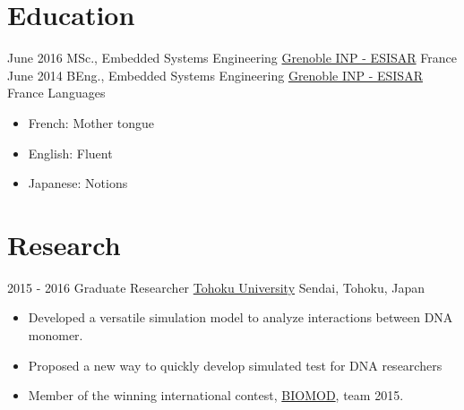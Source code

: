 \documentclass[a4paper]{template} %
\begin{document}
\makeprofile %

\section{Education}

\begin{twenty} %
	\twentyitem
    	{June 2016}
        {MSc., Embedded Systems Engineering}
        {\href{http://esisar.grenoble-inp.fr/}{Grenoble INP - ESISAR}}
        {France}
				{}
	\twentyitem
    	{June 2014}
        {BEng., Embedded Systems Engineering}
        {\href{http://esisar.grenoble-inp.fr/}{Grenoble INP - ESISAR}}
        {France}
				{}
	\twentyitem
	    	{}
	        {Languages}
	        {}
	        {}
	        {
	        {\begin{itemize}
							\item French: Mother tongue
							\item English: Fluent
							\item Japanese: Notions
			    \end{itemize}}
	        }
\end{twenty}


\section{Research}
\begin{twenty}
	\twentyitem
    	{2015 - 2016}
        {Graduate Researcher}
        {\href{http://www.tohoku.ac.jp/en/}{Tohoku University}}
        {Sendai, Tohoku, Japan}
        {
        {\begin{itemize}
        \item Developed a versatile simulation model to analyze interactions between DNA monomer.
        \item Proposed a new way to quickly develop simulated test for DNA researchers
        \item Member of the winning international contest, \href{http://biomod.net/winners/2015.html}{BIOMOD}, team 2015.
    \end{itemize}}
        }
\end{twenty}

\end{document}
